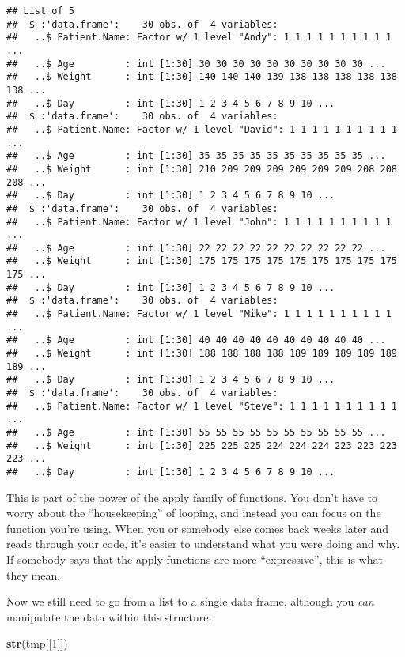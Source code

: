\documentclass[
]{article}
\newenvironment{Shaded}{\begin{snugshade}}{\end{snugshade}}
\newcommand{\DecValTok}[1]{\textcolor[rgb]{0.00,0.00,0.81}{#1}}
\newcommand{\KeywordTok}[1]{\textcolor[rgb]{0.13,0.29,0.53}{\textbf{#1}}}
\newcommand{\NormalTok}[1]{#1}
\begin{document}
\begin{verbatim}
## List of 5
##  $ :'data.frame':    30 obs. of  4 variables:
##   ..$ Patient.Name: Factor w/ 1 level "Andy": 1 1 1 1 1 1 1 1 1 1 ...
##   ..$ Age         : int [1:30] 30 30 30 30 30 30 30 30 30 30 ...
##   ..$ Weight      : int [1:30] 140 140 140 139 138 138 138 138 138 138 ...
##   ..$ Day         : int [1:30] 1 2 3 4 5 6 7 8 9 10 ...
##  $ :'data.frame':    30 obs. of  4 variables:
##   ..$ Patient.Name: Factor w/ 1 level "David": 1 1 1 1 1 1 1 1 1 1 ...
##   ..$ Age         : int [1:30] 35 35 35 35 35 35 35 35 35 35 ...
##   ..$ Weight      : int [1:30] 210 209 209 209 209 209 209 208 208 208 ...
##   ..$ Day         : int [1:30] 1 2 3 4 5 6 7 8 9 10 ...
##  $ :'data.frame':    30 obs. of  4 variables:
##   ..$ Patient.Name: Factor w/ 1 level "John": 1 1 1 1 1 1 1 1 1 1 ...
##   ..$ Age         : int [1:30] 22 22 22 22 22 22 22 22 22 22 ...
##   ..$ Weight      : int [1:30] 175 175 175 175 175 175 175 175 175 175 ...
##   ..$ Day         : int [1:30] 1 2 3 4 5 6 7 8 9 10 ...
##  $ :'data.frame':    30 obs. of  4 variables:
##   ..$ Patient.Name: Factor w/ 1 level "Mike": 1 1 1 1 1 1 1 1 1 1 ...
##   ..$ Age         : int [1:30] 40 40 40 40 40 40 40 40 40 40 ...
##   ..$ Weight      : int [1:30] 188 188 188 188 189 189 189 189 189 189 ...
##   ..$ Day         : int [1:30] 1 2 3 4 5 6 7 8 9 10 ...
##  $ :'data.frame':    30 obs. of  4 variables:
##   ..$ Patient.Name: Factor w/ 1 level "Steve": 1 1 1 1 1 1 1 1 1 1 ...
##   ..$ Age         : int [1:30] 55 55 55 55 55 55 55 55 55 55 ...
##   ..$ Weight      : int [1:30] 225 225 225 224 224 224 223 223 223 223 ...
##   ..$ Day         : int [1:30] 1 2 3 4 5 6 7 8 9 10 ...
\end{verbatim}

This is part of the power of the apply family of functions. You don't
have to worry about the ``housekeeping'' of looping, and instead you can
focus on the function you're using. When you or somebody else comes back
weeks later and reads through your code, it's easier to understand what
you were doing and why. If somebody says that the apply functions are
more ``expressive'', this is what they mean.

Now we still need to go from a list to a single data frame, although you
\emph{can} manipulate the data within this structure:

\begin{Shaded}
\begin{Highlighting}[]
\KeywordTok{str}\NormalTok{(tmp[[}\DecValTok{1}\NormalTok{]])}
\end{Highlighting}
\end{Shaded}
\end{document}
